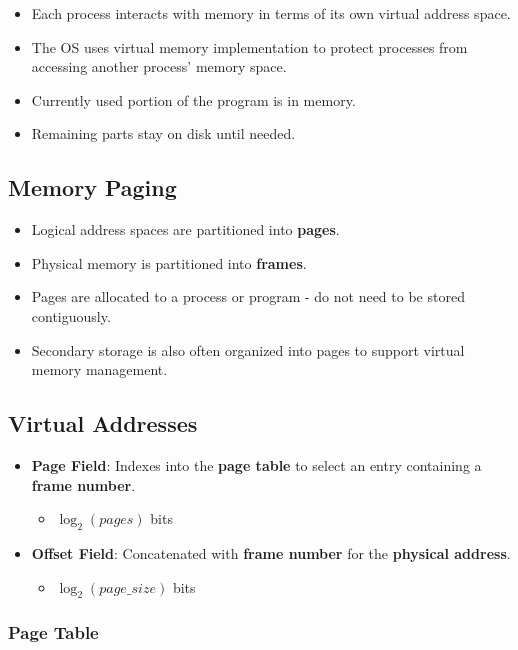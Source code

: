 \documentclass[12pt, letterpaper]{article}
\begin{document}
\begin{itemize}
  \item Each process interacts with memory in terms of its own
    virtual address space.
  \item The OS uses virtual memory implementation to protect
    processes from accessing another process' memory space.
  \item Currently used portion of the program is in memory.
  \item Remaining parts stay on disk until needed.
\end{itemize}

\subsection*{Memory Paging}

\begin{itemize}
  \item Logical address spaces are partitioned into \textbf{pages}.
  \item Physical memory is partitioned into \textbf{frames}.
  \item Pages are allocated to a process or program - do not need to
    be stored contiguously.
  \item Secondary storage is also often organized into pages to
    support virtual memory management.
\end{itemize}

\subsection*{Virtual Addresses}

\begin{itemize}
  \item \textbf{Page Field}: Indexes into the \textbf{page table} to
    select an entry containing a \textbf{frame number}.
    \begin{itemize}
      \item $ \log_2(pages) $ bits
    \end{itemize}
  \item \textbf{Offset Field}: Concatenated with \textbf{frame number} for
    the \textbf{physical address}.
    \begin{itemize}
      \item $ \log_2(page\_size) $ bits
    \end{itemize}
\end{itemize}

\subsubsection*{Page Table}
\end{document}
